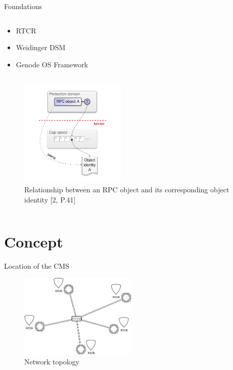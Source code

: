 \documentclass[
  english,            %
  aspectratio=169,    %
]{tumbeamer}
\begin{document}
\begin{frame}{Foundations}
\begin{column}{0.3\textwidth}
  \begin{itemize}
      \item RTCR
      \item Weidinger DSM
      \item Genode OS Framework
  \end{itemize}
\end{column}
\begin{column}{0.7\textwidth}\raggedleft
  \begin{figure}
      \centering
      \includegraphics[width=0.45\textwidth]{Cap_space.PNG}
      \caption{Relationship between an RPC object and its corresponding object identity [2, P.41]}
      \label{fig:cap_space}
  \end{figure}
\end{column}
\end{frame}

\section{Concept}
\begin{frame}{Location of the CMS}
\begin{figure}
    \centering
    \includegraphics[width=0.5\textwidth]{CMS_Network_topology.png}
    \caption{Network topology}
    \label{fig:network}
\end{figure}
\end{frame}
\end{document}
